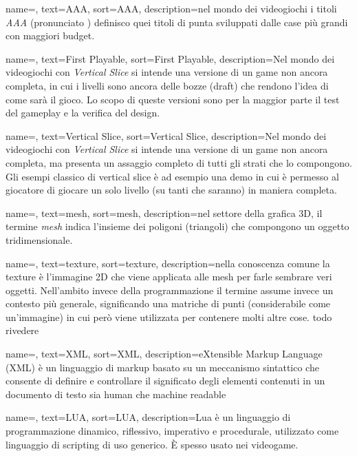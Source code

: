 {
	name=,
	text=AAA,
	sort=AAA,
	description={nel mondo dei videogiochi i titoli \emph{AAA} (pronunciato ) definisco quei titoli di punta sviluppati dalle case più grandi con maggiori budget.}
}

{
	name=,
	text=First Playable,
	sort=First Playable,
	description={Nel mondo dei videogiochi con \emph{Vertical Slice} si intende una versione di un game non ancora completa, in cui i livelli sono ancora delle bozze (draft) che rendono l'idea di come sarà il gioco. Lo scopo di queste versioni sono per la maggior parte il test del gameplay e la verifica del design.}
}

{
	name=,
	text=Vertical Slice,
	sort=Vertical Slice,
	description={Nel mondo dei videogiochi con \emph{Vertical Slice} si intende una versione di un game non ancora completa, ma presenta un assaggio completo di tutti gli strati che lo compongono. Gli esempi classico di vertical slice è ad esempio una demo in cui è permesso al giocatore di giocare un solo livello (su tanti che saranno) in maniera completa.}
}

{
	name=,
	text=mesh,
	sort=mesh,
	description={nel settore della grafica 3D, il termine \emph{mesh} indica l'insieme dei poligoni (triangoli) che compongono un oggetto tridimensionale.}
}

{
	name=,
	text=texture,
	sort=texture,
	description={nella conoscenza comune la texture è l'immagine 2D che viene applicata alle mesh per farle sembrare veri oggetti. Nell'ambito invece della programmazione il termine assume invece un contesto più generale, significando una matriche di punti (considerabile come un'immagine) in cui però viene utilizzata per contenere molti altre cose. todo rivedere}
}

{
	name=,
	text=XML,
	sort=XML,
	description={eXtensible Markup Language (XML) è un linguaggio di markup basato su un meccanismo sintattico che consente di definire e controllare il significato degli elementi contenuti in un documento di testo sia human che machine readable}
}

{
	name=,
	text=LUA,
	sort=LUA,
	description={Lua è un linguaggio di programmazione dinamico, riflessivo, imperativo e procedurale, utilizzato come linguaggio di scripting di uso generico. È spesso usato nei videogame.}
}

